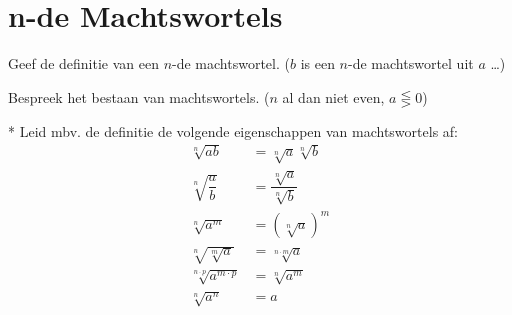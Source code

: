 \documentclass[12pt,twoside]{article}
\begin{document}
\pagebreak
\section{n-de Machtswortels}

\begin{oefening}
Geef de definitie van een $n$-de machtswortel. ($b$ is een $n$-de machtswortel uit $a$ \ldots)
\end{oefening}

\begin{oefening}
Bespreek het bestaan van machtswortels. ($n$ al dan niet even, $a \lesseqgtr 0$)
\end{oefening}

\begin{oefening}*
Leid mbv. de definitie de volgende eigenschappen van machtswortels af:
\begin{align*}
  \sqrt[n]{ab} &= \sqrt[n]{a}\sqrt[n]{b}\\
  \sqrt[n]{\dfrac{a}{b}} &= \dfrac{\sqrt[n]{a}}{\sqrt[n]{b}}\\
  \sqrt[n]{a^m} &= \left(\sqrt[n]{a}\right)^m\\
  \sqrt[n]{\sqrt[m]{a}} &= \sqrt[n\cdot m]{a}\\
  \sqrt[n\cdot p]{a^{m\cdot p}} &= \sqrt[n]{a^m}\\
  \sqrt[n]{a^n} &= a
\end{align*}
\end{oefening}
\end{document}
